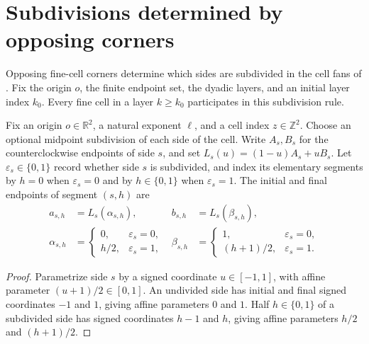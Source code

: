 \section{Subdivisions determined by opposing corners}
\label{sec:area_law_actual_side_mask}

Opposing fine-cell corners determine which sides are subdivided in the cell
fans of \cite[Section~11]{OpenAI2026AreaLaw}. Fix the origin $o$, the finite
endpoint set, the dyadic layers, and an initial layer index $k_0$. Every fine
cell in a layer $k\ge k_0$ participates in this subdivision rule.



\begin{lemma}
    \label{thm:area_law_indexed_side_interpolation}
    \leanok
    Fix an origin $o\in\mathbb R^2$, a natural exponent
    $\ell$, and a cell index $z\in\mathbb Z^2$.
    Choose an optional midpoint subdivision of each side of the cell.
    Write $A_s,B_s$ for the counterclockwise endpoints of side $s$, and set
    $L_s(u)=(1-u)A_s+uB_s$.
    Let $\varepsilon_s\in\{0,1\}$ record whether side $s$ is subdivided,
    and index its elementary segments by $h=0$ when $\varepsilon_s=0$
    and by $h\in\{0,1\}$ when $\varepsilon_s=1$.
    The initial and final endpoints of segment $(s,h)$ are
    \begin{align}
        a_{s,h}      & =L_s(\alpha_{s,h}), &
        b_{s,h}      & =L_s(\beta_{s,h}),      \\
        \alpha_{s,h} & =
        \begin{cases}
            0,   & \varepsilon_s=0, \\
            h/2, & \varepsilon_s=1,
        \end{cases}
                     & \beta_{s,h}         & =
        \begin{cases}
            1,       & \varepsilon_s=0, \\
            (h+1)/2, & \varepsilon_s=1.
        \end{cases}
    \end{align}
\end{lemma}
\begin{proof}\leanok
    Parametrize side $s$ by a signed coordinate $u\in[-1,1]$, with affine
    parameter $(u+1)/2\in[0,1]$.
    An undivided side has initial and final signed coordinates $-1$ and $1$,
    giving affine parameters $0$ and $1$.
    Half $h\in\{0,1\}$ of a subdivided side has signed coordinates $h-1$
    and $h$, giving affine parameters $h/2$ and $(h+1)/2$.
\end{proof}

